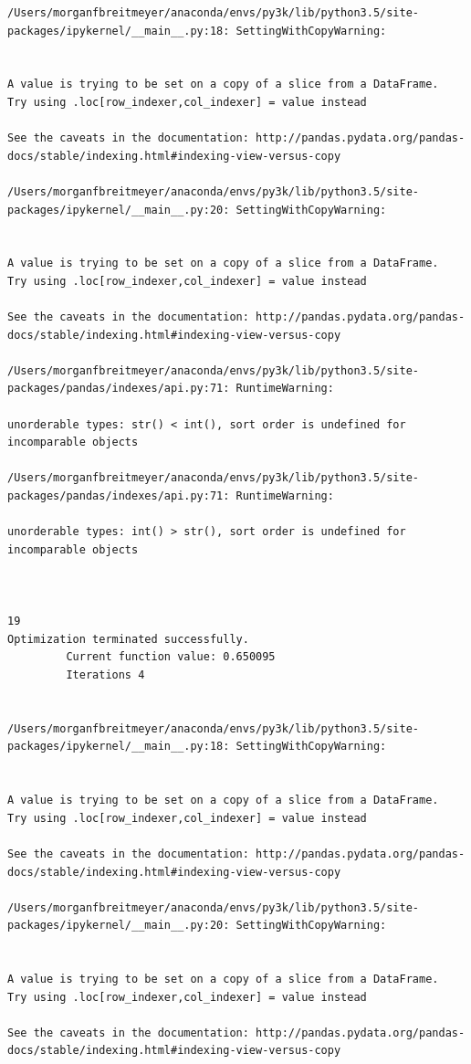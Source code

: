 \begin{lstlisting}
/Users/morganfbreitmeyer/anaconda/envs/py3k/lib/python3.5/site-packages/ipykernel/__main__.py:18: SettingWithCopyWarning:


A value is trying to be set on a copy of a slice from a DataFrame.
Try using .loc[row_indexer,col_indexer] = value instead

See the caveats in the documentation: http://pandas.pydata.org/pandas-docs/stable/indexing.html#indexing-view-versus-copy

/Users/morganfbreitmeyer/anaconda/envs/py3k/lib/python3.5/site-packages/ipykernel/__main__.py:20: SettingWithCopyWarning:


A value is trying to be set on a copy of a slice from a DataFrame.
Try using .loc[row_indexer,col_indexer] = value instead

See the caveats in the documentation: http://pandas.pydata.org/pandas-docs/stable/indexing.html#indexing-view-versus-copy

/Users/morganfbreitmeyer/anaconda/envs/py3k/lib/python3.5/site-packages/pandas/indexes/api.py:71: RuntimeWarning:

unorderable types: str() < int(), sort order is undefined for incomparable objects

/Users/morganfbreitmeyer/anaconda/envs/py3k/lib/python3.5/site-packages/pandas/indexes/api.py:71: RuntimeWarning:

unorderable types: int() > str(), sort order is undefined for incomparable objects



19
Optimization terminated successfully.
         Current function value: 0.650095
         Iterations 4


/Users/morganfbreitmeyer/anaconda/envs/py3k/lib/python3.5/site-packages/ipykernel/__main__.py:18: SettingWithCopyWarning:


A value is trying to be set on a copy of a slice from a DataFrame.
Try using .loc[row_indexer,col_indexer] = value instead

See the caveats in the documentation: http://pandas.pydata.org/pandas-docs/stable/indexing.html#indexing-view-versus-copy

/Users/morganfbreitmeyer/anaconda/envs/py3k/lib/python3.5/site-packages/ipykernel/__main__.py:20: SettingWithCopyWarning:


A value is trying to be set on a copy of a slice from a DataFrame.
Try using .loc[row_indexer,col_indexer] = value instead

See the caveats in the documentation: http://pandas.pydata.org/pandas-docs/stable/indexing.html#indexing-view-versus-copy


\end{lstlisting}
